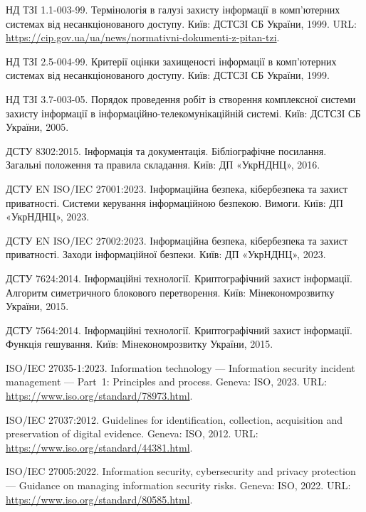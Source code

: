  НД ТЗІ 1.1-003-99. Термінологія в галузі захисту інформації в комп'ютерних системах від несанкціонованого доступу. Київ: ДСТСЗІ СБ України, 1999. URL: \url{https://cip.gov.ua/ua/news/normativni-dokumenti-z-pitan-tzi}.

 НД ТЗІ 2.5-004-99. Критерії оцінки захищеності інформації в комп'ютерних системах від несанкціонованого доступу. Київ: ДСТСЗІ СБ України, 1999.

 НД ТЗІ 3.7-003-05. Порядок проведення робіт із створення комплексної системи захисту інформації в інформаційно-телекомунікаційній системі. Київ: ДСТСЗІ СБ України, 2005.

 ДСТУ 8302:2015. Інформація та документація. Бібліографічне посилання. Загальні положення та правила складання. Київ: ДП «УкрНДНЦ», 2016.

 ДСТУ EN ISO/IEC 27001:2023. Інформаційна безпека, кібербезпека та захист приватності. Системи керування інформаційною безпекою. Вимоги. Київ: ДП «УкрНДНЦ», 2023.

 ДСТУ EN ISO/IEC 27002:2023. Інформаційна безпека, кібербезпека та захист приватності. Заходи інформаційної безпеки. Київ: ДП «УкрНДНЦ», 2023.

 ДСТУ 7624:2014. Інформаційні технології. Криптографічний захист інформації. Алгоритм симетричного блокового перетворення. Київ: Мінекономрозвитку України, 2015.

 ДСТУ 7564:2014. Інформаційні технології. Криптографічний захист інформації. Функція гешування. Київ: Мінекономрозвитку України, 2015.

 ISO/IEC 27035-1:2023. Information technology --- Information security incident management --- Part~1: Principles and process. Geneva: ISO, 2023. URL: \url{https://www.iso.org/standard/78973.html}.

 ISO/IEC 27037:2012. Guidelines for identification, collection, acquisition and preservation of digital evidence. Geneva: ISO, 2012. URL: \url{https://www.iso.org/standard/44381.html}.

 ISO/IEC 27005:2022. Information security, cybersecurity and privacy protection --- Guidance on managing information security risks. Geneva: ISO, 2022. URL: \url{https://www.iso.org/standard/80585.html}.


